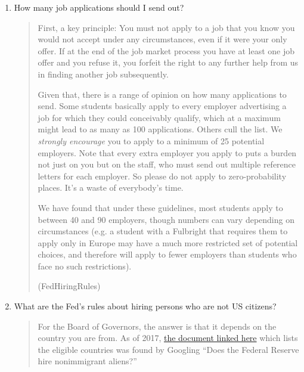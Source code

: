 \documentclass{\classes/econtex}
\providecommand\phantomsection{}
\begin{document}
\begin{enumerate}
\begin{quote}
    \end{quote}
  \item  {} 
    How many job applications should I send out?

    \begin{quote}
      First, a key principle: You must not apply to a job that you know you would not
      accept under any circumstances, even if it were your only offer.  If
      at the end of the job market process you have at least one job offer
      and you refuse it, you forfeit the right to any further help from us
      in finding another job subsequently.  %

      Given that, there is a range of opinion on how many applications to send.  Some students basically apply to every employer advertising a job for which they could conceivably qualify, which at a maximum might lead to as many as 100 applications.  Others cull the list.  We \textit{strongly encourage} you to apply to a minimum of 25 potential employers.  Note that every extra employer you apply to puts a burden not just on you but on the staff, who must send out multiple reference letters for each employer.  So please do not apply to zero-probability places.  It's a waste of everybody's time.

      We have found that under these guidelines, most students apply to between 
      40 and 90 employers, though numbers can vary depending on circumstances 
      (e.g. a student with a Fulbright that requires them to apply only in 
      Europe may have a much more restricted set of potential choices,
      and therefore will apply to fewer employers than students who face
      no such restrictions).


      \ifdvi\phantomsection\hypertarget{FedHiringRules}{(FedHiringRules)}\fi

    \end{quote}
  \item  {}  What are the Fed's rules about hiring persons who are not US citizens? 

    \begin{quote}
      For the Board of Governors, the answer is that it depends on the country you are from.  As of 2017, \href{https://www.federalreserve.gov/boarddocs/srletters/2006/SR0614a3.pdf}{the document linked here} which lists the eligible countries was found by Googling ``Does the Federal Reserve hire nonimmigrant aliens?'' 


\end{quote}
\end{enumerate}
\end{document}
